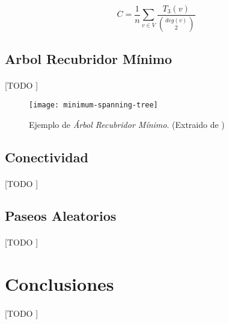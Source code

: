 \documentclass{subfiles}
\begin{document}
        \begin{equation}
        \label{eq:clustering_coefficient_graph}
          C = \frac{1}{n} \sum_{v\in V} \frac{T_3(v)}{\binom{deg(v)}{2}}
        \end{equation}



      \subsection{Arbol Recubridor Mínimo}
      \label{sec:minimum_spanning_tree}

        \paragraph{}
        [TODO ]

        \begin{figure}
          \centering
          \texttt{[image: minimum-spanning-tree]}
          \caption{Ejemplo de \emph{Árbol Recubridor Mínimo}. (Extraido de \cite{wiki:Minimum_spanning_tree})}
          \label{img:minimum_spanning_tree}
        \end{figure}

      \subsection{Conectividad}
      \label{sec:graph_connectiviy}

        \paragraph{}
        [TODO ]

      \subsection{Paseos Aleatorios}
      \label{sec:random_walks}

        \paragraph{}
        [TODO ]

    \section{Conclusiones}
    \label{sec:graphs_conclusions}

      \paragraph{}
      [TODO ]
\end{document}
